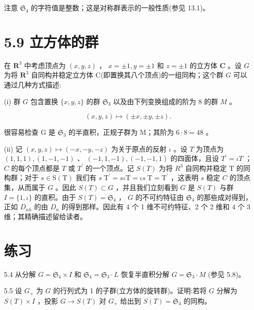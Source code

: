 \documentclass[10pt]{article}
\begin{document}
注意 \({\mathfrak{S}}_{4}\) 的字符值是整数；这是对称群表示的一般性质(参见 13.1)。

\section*{5.9 立方体的群}

在 \({\mathbf{R}}^{3}\) 中考虑顶点为 \(\left( {x,y,z}\right)\) ， \(x =  \pm  1,y =  \pm  1\) 和 \(z =  \pm  1\) 的立方体 \(\mathbf{C}\) 。设 \(G\) 为将 \({\mathbf{R}}^{3}\) 自同构并稳定立方体 C(即置换其八个顶点)的一组同构；这个群 \(G\) 可以通过几种方式描述:

(i) 群 \(G\) 包含置换 \(\{ x,y,z\}\) 的群 \({\mathfrak{S}}_{3}\) 以及由下列变换组成的阶为 8 的群 \(M\) 。

\[
\left( {x,y,z}\right)  \mapsto  \left( {\pm x, \pm  y, \pm  z}\right) .
\]

很容易检查 \(\mathrm{G}\) 是 \({\mathfrak{S}}_{3}\) 的半直积，正规子群为 M；其阶为 \(6 \cdot  8 = {48}\) 。

(ii) 记 \(\left( {x,y,z}\right)  \mapsto  \left( {-x, - y, - z}\right)\) 为关于原点的反射 \(\iota\) 。设 \(T\) 为顶点为 \(\left( {1,1,1}\right) ,\left( {1, - 1, - 1}\right)\) 、 \(\left( {-1,1, - 1}\right) ,\left( {-1, - 1,1}\right)\) 的四面体，且设 \({T}^{\prime } = {\iota T}\) ； \(C\) 的每个顶点都是 \(T\) 或 \({T}^{\prime }\) 的一个顶点。记 \(S\left( T\right)\) 为将 \({R}^{3}\) 自同构并稳定 \(\mathrm{T}\) 的同构群；对于 \(s \in  \mathrm{S}\left( \mathrm{T}\right)\) 我们有 \(s{\mathrm{\;T}}^{\prime } = {s\iota }\mathrm{T} = {\iota s}\mathrm{\;T} = {\mathrm{T}}^{\prime }\) ，这表明 \(s\) 稳定 \(C\) 的顶点集，从而属于 \(G\) 。因此 \(S\left( T\right)  \subset  G\) ，并且我们立刻看到 \(G\) 是 \(S\left( T\right)\) 与群 \(I = \{ 1,\iota \}\) 的直积。由于 \(S\left( T\right)  = {\mathfrak{S}}_{4}\) ， \(G\) 的不可约特征由 \({\mathfrak{S}}_{4}\) 的那些成对得到，正如 \({D}_{nh}\) 的由 \({D}_{n}\) 的得到那样。因此有 4 个 1 维不可约特征、2 个 2 维和 4 个 3 维；其精确描述留给读者。

\section*{练习}

5.4 从分解 \(G = {\mathfrak{S}}_{4} \times  I\) 和 \({\mathfrak{S}}_{4} = {\mathfrak{S}}_{3} \cdot  L\) 恢复半直积分解 \(G = {\mathfrak{S}}_{3} \cdot  M\) (参见 5.8)。

5.5 设 \({G}_{ + }\) 为 \(G\) 的行列式为 1 的子群(立方体的旋转群)。证明:若将 \(G\) 分解为 \(S\left( T\right)  \times  I\) ，投影 \(G \rightarrow  S\left( T\right)\) 对 \({G}_{ + }\) 给出到 \(S\left( T\right)  = {\mathfrak{S}}_{4}\) 的同构。
\end{document}
